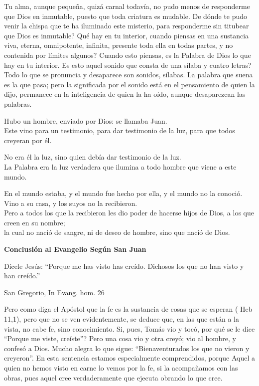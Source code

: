 \documentclass[12pt]{article}
\begin{document}
Tu alma, aunque pequeña, quizá carnal todavía, no pudo menos de responderme que Dios en inmutable, puesto que toda criatura es mudable. \textquestiondown De dónde te pudo venir la chispa que te ha iluminado este misterio, para responderme sin titubear que Dios es inmutable? \textquestiondown Qué hay en tu interior, cuando piensas en una sustancia viva, eterna, omnipotente, infinita, presente toda ella en todas partes, y no contenida por límites algunos? Cuando esto piensas, es la Palabra de Dios lo que hay en tu interior. \textquestiondown Es esto aquel sonido que consta de una sílaba y cuatro letras? Todo lo que se pronuncia y desaparece son sonidos, sílabas. La palabra que suena es la que pasa; pero la significada por el sonido está en el pensamiento de quien la dijo, permanece en la inteligencia de quien la ha oído, aunque desaparezcan las palabras.

\textrm{
 Hubo un hombre, enviado por Dios: se llamaba Juan.\\
 Este vino para un testimonio, para dar testimonio de la luz, para que todos creyeran por él.\\
}

\textrm{
 No era él la luz, sino quien debía dar testimonio de la luz.\\
 La Palabra era la luz verdadera que ilumina a todo hombre que viene a este mundo.\\
}

\textrm{
 En el mundo estaba, y el mundo fue hecho por ella, y el mundo no la conoció.\\	
 Vino a su casa, y los suyos no la recibieron.\\
 Pero a todos los que la recibieron les dio poder de hacerse hijos de Dios, a los que creen en su nombre;\\
 la cual no nació de sangre, ni de deseo de hombre, sino que nació de Dios.}



\noindent \textbf{Conclusión al Evangelio Según San Juan}


\noindent
\textrm{
 Dícele Jesús: ``Porque me has visto has creído. Dichosos los que no han visto y han creído.''}


\noindent San Gregorio, In Evang. hom. 26

Pero como diga el Apóstol que la fe es la sustancia de cosas que se esperan ( Heb 11,1), pero que no se ven evidentemente, se deduce que, en las que están a la vista, no cabe fe, sino conocimiento. Si, pues, Tomás vio y tocó, \textquestiondown por qué se le dice ``Porque me viste, creíste''? Pero una cosa vio y otra creyó; vio al hombre, y confesó a Dios. Mucho alegra lo que sigue: ``Bienaventurados los que no vieron y creyeron''. En esta sentencia estamos especialmente comprendidos, porque Aquel a quien no hemos visto en carne lo vemos por la fe, si la acompañamos con las obras, pues aquel cree verdaderamente que ejecuta obrando lo que cree.
\end{document}
